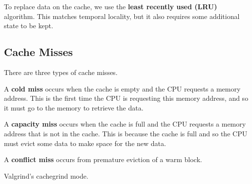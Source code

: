   \begin{theorem}[Replacement]
    \label{thm:replacement-2}
    To replace data on the cache, we use the \textbf{least recently used (LRU)} algorithm. This matches temporal locality, but it also requires some additional state to be kept. 
  \end{theorem}

\subsection{Cache Misses} 

  There are three types of cache misses. 

  \begin{definition}
    \label{def:cold-compulsory-miss}
    A \textbf{cold miss} occurs when the cache is empty and the CPU requests a memory address. This is the first time the CPU is requesting this memory address, and so it must go to the memory to retrieve the data.
  \end{definition}
  
  \begin{definition}
    \label{def:capacity-miss}
    A \textbf{capacity miss} occurs when the cache is full and the CPU requests a memory address that is not in the cache. This is because the cache is full and so the CPU must evict some data to make space for the new data.
  \end{definition}

  \begin{definition}
    \label{def:conflict-miss}
    A \textbf{conflict miss} occurs from premature eviction of a warm block. 
  \end{definition}

  Valgrind's cachegrind mode. 



